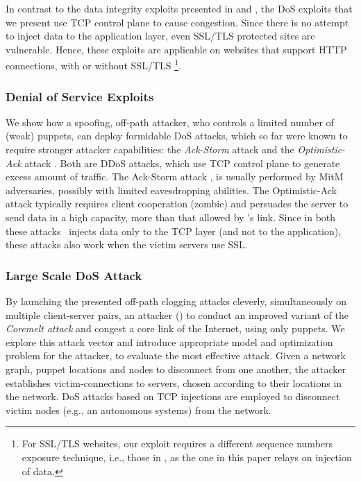 \documentclass[conference]{IEEEtran}
\begin{document}
In contrast to the data integrity exploits presented in \cite{snptcp} and \cite{woottcp}, the DoS exploits that we present use TCP control plane to cause congestion. Since there is no attempt to inject data to the application layer, even SSL/TLS protected sites are vulnerable. Hence, these exploits are applicable on websites that support HTTP connections, with or without SSL/TLS \footnote{For SSL/TLS websites, our exploit requires a different sequence numbers exposure technique, i.e., those in \cite{lkm:phrack:07,snptcp,woottcp}, as the one in this paper relays on injection of data.}.

\subsubsection{Denial of Service Exploits}
We show how a spoofing, off-path attacker, who controls a limited number of (weak) puppets, can deploy formidable DoS attacks, which so far were known to require  stronger attacker capabilities: the {\em Ack-Storm} attack \cite{AH11:Ack} and the {\em Optimistic-Ack} attack \cite{SBB05:OptAck}. Both are DDoS attacks, which use TCP control plane to generate excess amount of traffic. The Ack-Storm attack \cite{AH11:Ack}, is usually performed by MitM adversaries, possibly with limited eavesdropping abilities.  The Optimistic-Ack attack \cite{SBB05:OptAck} typically requires client cooperation (zombie) and persuades the server to send data in a high capacity, more than that allowed by \wini's link. 
Since in both these attacks \mal\ injects data only to the TCP layer (and not to the application), these attacks also work when the victim servers use SSL.






\subsubsection{Large Scale DoS Attack}
By launching the presented off-path clogging attacks cleverly, simultaneously on multiple client-server pairs, an attacker (\mal) to conduct an improved variant of the {\em Coremelt attack} \cite{conf/esorics/StuderP09} and congest a core link of the Internet, using only puppets. We explore this attack vector and introduce appropriate model and optimization problem for the attacker, to evaluate the most effective attack. 
Given a network graph, puppet locations and nodes to disconnect from one another, the attacker establishes victim-connections to servers, chosen according to their locations in the network. DoS attacks based on TCP injections are employed to disconnect victim nodes (e.g., an autonomous systems) from the network.
\end{document}
